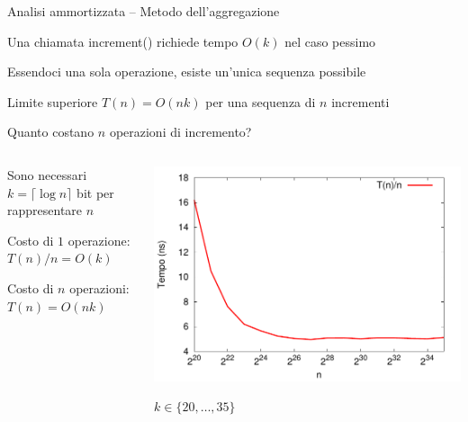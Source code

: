 \begin{frame}{Analisi ammortizzata -- Metodo dell'aggregazione}

\begin{myboxtitle}
\BI
\item Una chiamata \textsf{increment}() richiede tempo $O(k)$ nel caso pessimo 
\item Essendoci una sola operazione, esiste un'unica sequenza possibile
\item Limite superiore $T(n) = O(nk)$ per una sequenza di $n$ incrementi
\EI
\end{myboxtitle}

\end{frame}

\begin{frame}{Quanto costano $n$ operazioni di incremento?}


\begin{columns}[T]
\begin{column}{0.38\textwidth}
\BIL
\item Sono necessari \alert{$k = \lceil \log n \rceil$} bit per rappresentare $n$
\item Costo di $1$ operazione: \alert{$T(n)/n = O(k)$}
\item Costo di $n$ operazioni: \alert{$T(n) = O(nk)$}
\EIL

\end{column}
\begin{column}{0.62\textwidth}
\pause
\includegraphics[width=\textwidth]{plot1.pdf}

\bigskip
\hspace{2cm} $k \in \{ 20, \ldots, 35 \}$


\end{column}
\end{columns}

\end{frame}

